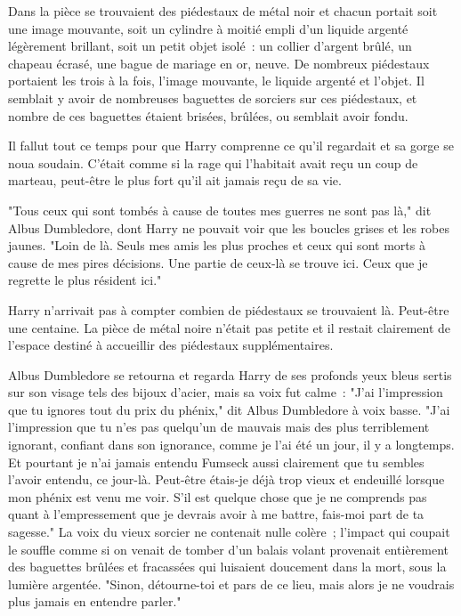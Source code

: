 Dans la pièce se trouvaient des piédestaux de métal noir et chacun portait soit une image mouvante, soit un cylindre à moitié empli d'un liquide argenté légèrement brillant, soit un petit objet isolé~: un collier d'argent brûlé, un chapeau écrasé, une bague de mariage en or, neuve. De nombreux piédestaux portaient les trois à la fois, l'image mouvante, le liquide argenté et l'objet. Il semblait y avoir de nombreuses baguettes de sorciers sur ces piédestaux, et nombre de ces baguettes étaient brisées, brûlées, ou semblait avoir fondu.

Il fallut tout ce temps pour que Harry comprenne ce qu'il regardait et sa gorge se noua soudain. C'était comme si la rage qui l'habitait avait reçu un coup de marteau, peut-être le plus fort qu'il ait jamais reçu de sa vie.

"Tous ceux qui sont tombés à cause de toutes mes guerres ne sont pas là," dit Albus Dumbledore, dont Harry ne pouvait voir que les boucles grises et les robes jaunes. "Loin de là. Seuls mes amis les plus proches et ceux qui sont morts à cause de mes pires décisions. Une partie de ceux-là se trouve ici. Ceux que je regrette le plus résident ici."

Harry n'arrivait pas à compter combien de piédestaux se trouvaient là. Peut-être une centaine. La pièce de métal noire n'était pas petite et il restait clairement de l'espace destiné à accueillir des piédestaux supplémentaires.

Albus Dumbledore se retourna et regarda Harry de ses profonds yeux bleus sertis sur son visage tels des bijoux d'acier, mais sa voix fut calme~: "J'ai l'impression que tu ignores tout du prix du phénix," dit Albus Dumbledore à voix basse. "J'ai l'impression que tu n'es pas quelqu'un de mauvais mais des plus terriblement ignorant, confiant dans son ignorance, comme je l'ai été un jour, il y a longtemps. Et pourtant je n'ai jamais entendu Fumseck aussi clairement que tu sembles l'avoir entendu, ce jour-là. Peut-être étais-je déjà trop vieux et endeuillé lorsque mon phénix est venu me voir. S'il est quelque chose que je ne comprends pas quant à l'empressement que je devrais avoir à me battre, fais-moi part de ta sagesse." La voix du vieux sorcier ne contenait nulle colère~; l'impact qui coupait le souffle comme si on venait de tomber d'un balais volant provenait entièrement des baguettes brûlées et fracassées qui luisaient doucement dans la mort, sous la lumière argentée. "Sinon, détourne-toi et pars de ce lieu, mais alors je ne voudrais plus jamais en entendre parler."

